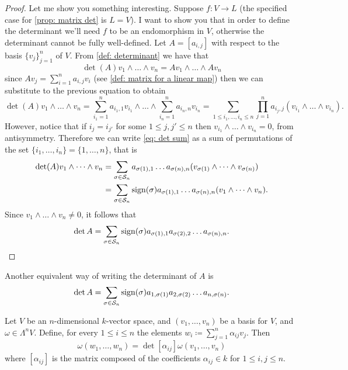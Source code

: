 \begin{proof}
Let me show you something interesting. Suppose \(f: V \to L\) (the specified
case for \cref{prop: matrix det} is \(L = V\)). I want to show you that in
order to define the determinant we'll need \(f\) to be an endomorphism in
\(V\), otherwise the determinant cannot be fully well-defined. Let \(A =
[a_{i, j}]\) with respect to the basis \(\{v_j\}_{j=1}^n\) of \(V\). From
\cref{def: determinant} we have that
\[
  \det(A) v_1 \wedge \dots \wedge v_n = A v_1 \wedge \dots \wedge A v_n
\]
since \(A v_j = \sum_{i = 1}^n a_{i, j} v_i\) (see \cref{def: matrix for a
linear map}) then we can substitute to the previous equation to obtain
\begin{equation}\label{eq: det sum}
  \det(A) v_1 \wedge \dots \wedge v_n
  = \sum_{i_1 = 1}^n a_{i_1, 1} v_{i_1} \wedge \dots \wedge \sum_{i_n = 1}^n
  a_{i_n, n} v_{i_n}
  = \sum_{1 \leq i_1, \dots, i_n \leq n} \prod_{j=1}^n a_{i_j, j} (v_{i_1}
  \wedge \dots \wedge v_{i_n}).
\end{equation}
However, notice that if \(i_j = i_{j'}\) for some \(1 \leq j, j' \leq n\) then
\(v_{i_1} \wedge \dots \wedge v_{i_n} = 0\), from antisymmetry.
Therefore we can write \cref{eq: det sum} as a sum of permutations of the set
\(\{i_1, \dots, i_n\} = \{1, \dots, n\}\), that is
\begin{align*}
  \det(A) v_1 \wedge \dots \wedge v_n
  &= \sum_{\sigma \in \mathcal S_n} a_{\sigma(1), 1} \dots a_{\sigma(n), n}
  (v_{\sigma(1)} \wedge \dots \wedge v_{\sigma(n)}) \\
  &= \sum_{\sigma \in \mathcal S_n} \operatorname{sign}(\sigma) a_{\sigma(1), 1} \dots
  a_{\sigma(n), n} (v_1 \wedge \dots \wedge v_n).
\end{align*}
Since \(v_1 \wedge \dots \wedge v_n \neq 0\), it follows that
\[
  \det A = \sum_{\sigma \in \mathcal S_n} \operatorname{sign}(\sigma) a_{\sigma(1), 1}
  a_{\sigma(2), 2} \dots a_{\sigma(n), n}.
\]
\end{proof}

\begin{corollary}
Another equivalent way of writing the determinant of \(A\) is
\[
  \det A = \sum_{\sigma \in \mathcal S_n} \operatorname{sign}(\sigma) a_{1, \sigma(1)} a_{2,
  \sigma(2)} \dots a_{n, \sigma(n)}.
\]
\end{corollary}

\begin{proposition}
\label{prop:form-change-basis-det}
Let \(V\) be an \(n\)-dimensional \(k\)-vector space, and \((v_1, \dots,
v_n)\) be a basis for \(V\), and \(\omega \in \Lambda^n V\). Define, for every
\(1 \leq i \leq n\) the elements \(w_i \coloneq \sum_{j=1}^n \alpha_{i j}
v_j\). Then
\[
  \omega(w_1, \dots, w_n) = \det[\alpha_{i j}] \omega(v_1, \dots, v_n)
\]
where \([\alpha_{i j}]\) is the matrix composed of the coefficients
\(\alpha_{ij} \in k\) for \(1 \leq i, j \leq n\).
\end{proposition}

